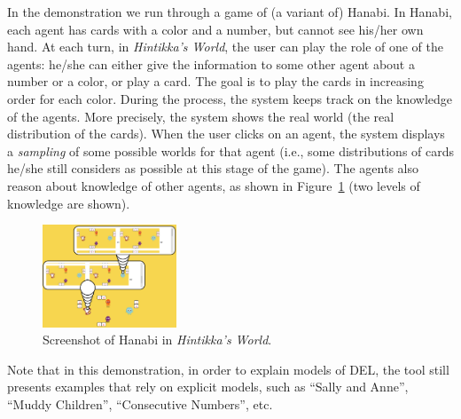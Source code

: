 
In the demonstration we run through a game of (a variant of) Hanabi. 
In Hanabi, each agent has cards with a color and a
number, but cannot see his/her own hand.
At each turn, in \emph{Hintikka's World}, the user can play the role of one of the agents: he/she can either give the information to some other agent about a number or a color, or play a card. The goal is to play the cards in increasing order for each color.
During the process, the system keeps track on the knowledge of the agents.
More precisely, the system shows the real world (the real distribution of the cards). When the user clicks on an agent, the system displays a \emph{sampling} of some possible worlds for that agent (i.e., some distributions of cards he/she still considers as possible at this stage of the game). The agents also reason about knowledge of other agents, as shown in Figure~\ref{figure:guihanabi} (two levels of knowledge are shown).
%
%
%


\begin{figure}
	\begin{center}
		\includegraphics[width=4cm]{images/HW_screenshot_hanabi.png}
	\end{center}
	\caption{Screenshot of Hanabi in \emph{Hintikka's World}.\label{figure:guihanabi}}
\end{figure}

Note that in this demonstration, in order to explain models of DEL, the tool still presents examples that rely on explicit models, such as ``Sally and Anne'', ``Muddy Children'', ``Consecutive Numbers'', etc.

